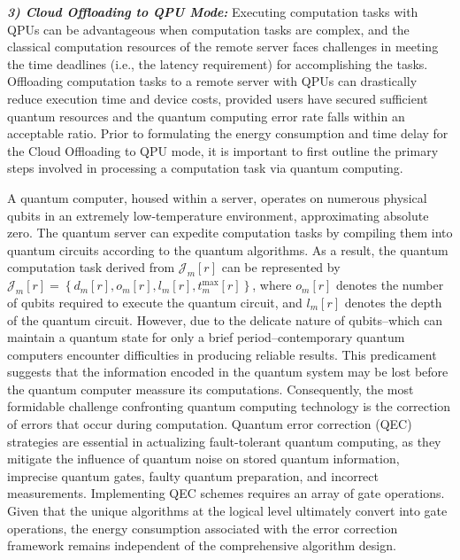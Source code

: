 \documentclass[journal]{IEEEtran}
\begin{document}
{\bf\em 3) Cloud Offloading to QPU Mode: }
Executing computation tasks with QPUs can be advantageous when computation tasks are complex, and the classical computation resources of the remote server faces challenges in meeting the time deadlines (i.e., the latency requirement) for accomplishing the tasks.
Offloading computation tasks to a remote server with QPUs can drastically reduce execution time and device costs, provided users have secured sufficient quantum resources and the quantum computing error rate falls within an acceptable ratio.
Prior to formulating the energy consumption and time delay for the Cloud Offloading to QPU mode, it is important to first outline the primary steps involved in processing a computation task via quantum computing.


A quantum computer, housed within a server, operates on numerous physical qubits in an extremely low-temperature environment, approximating absolute zero. The quantum server can expedite computation tasks by compiling them into quantum circuits according to the quantum algorithms. As a result, the quantum computation task derived from $\mathcal{J}_m[r]$ can be represented by $\mathcal{J}_m[r]=\left\{d_m[r], o_m[r],l_m[r], t_m^{\max}[r]\right\}$, where $o_m[r]$ denotes the number of qubits required to execute the quantum circuit, and $l_m[r]$ denotes the depth of the quantum circuit.
However, due to the delicate nature of qubits--which can maintain a quantum state for only a brief period--contemporary quantum computers encounter difficulties in producing reliable results. This predicament suggests that the information encoded in the quantum system may be lost before the quantum computer meassure its computations. Consequently, the most formidable challenge confronting quantum computing technology is the correction of errors that occur during computation.
Quantum error correction (QEC) strategies are essential in actualizing fault-tolerant quantum computing, as they mitigate the influence of quantum noise on stored quantum information, imprecise quantum gates, faulty quantum preparation, and incorrect measurements. Implementing QEC schemes requires an array of gate operations. Given that the unique algorithms at the logical level ultimately convert into gate operations, the energy consumption associated with the error correction framework remains independent of the comprehensive algorithm design.
\end{document}
